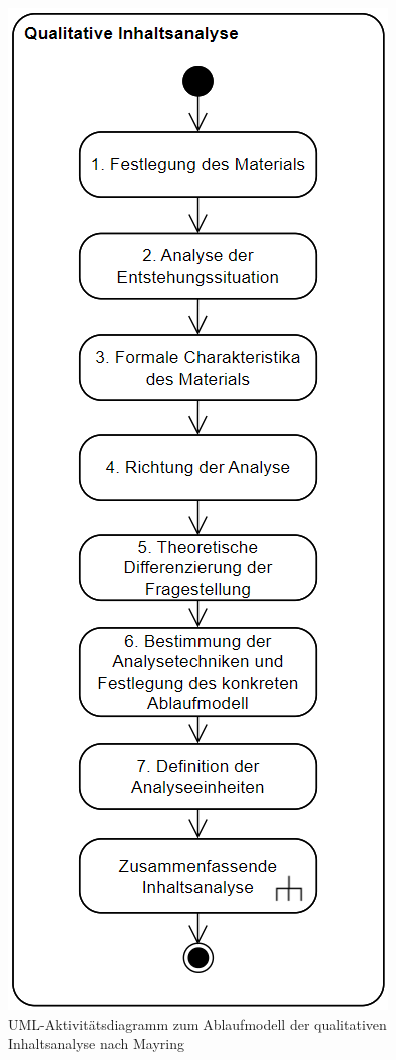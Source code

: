 \begin{figure}[H]
	\begin{minipage}[b]{.35\linewidth} %
		\includegraphics[scale=1.2]{Abbildungen/Ablaufmodell.png}
		\caption{UML-Aktivitätsdiagramm zum Ablaufmodell der qualitativen Inhaltsanalyse nach Mayring \cite{mayring2019qualitative}}

\end{minipage}
\end{figure}
